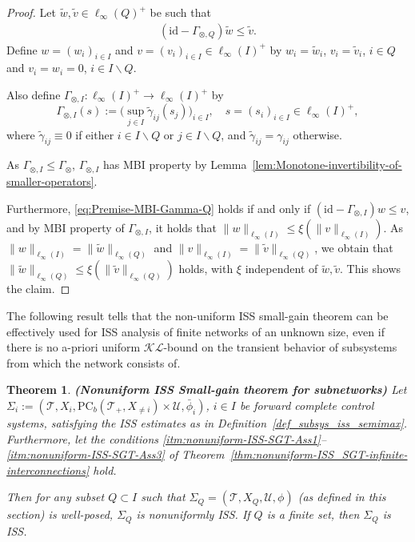 \documentclass[twocolumn]{IEEEtran} %
\newtheorem{theorem}{Theorem}[section]
\theoremstyle{definition}
\newcommand{\tm}{\times}%
\newcommand{\Uc}{\mathcal{U}}%
\newcommand{\KL}{\mathcal{KL}}%
\newcommand{\PC}{\mathrm{PC}}%
\newcommand{\id}{\mathrm{id}}%
\newcommand{\T}{\ensuremath{\mathcal{T}}}  %
\begin{document}
\begin{proof}
Let $\tilde{w},\tilde{v}\in \ell_{\infty}(Q)^+$ be such that 
\begin{eqnarray}
(\id - \Gamma_{\otimes,Q})\tilde{w} \leq \tilde{v}.
\label{eq:Premise-MBI-Gamma-Q}
\end{eqnarray}
Define $w = (w_i)_{i\in I}$ and $v = (v_i)_{i\in I} \in \ell_{\infty}(I)^+ $ by 
$w_i = \tilde{w}_i$, $v_i = \tilde{v}_i$, $i\in Q$ and $v_i = w_i = 0$, $i\in I\backslash Q$.

Also define $\Gamma_{\otimes,I}:  \ell_{\infty}(I)^+  \to  \ell_{\infty}(I)^+$ by 
\begin{equation}
\label{eq:Gain-operator-semimax-extending-restriction}
  \Gamma_{\otimes,I}(s) := \bigl(\sup_{j\in I}\tilde{\gamma}_{ij}(s_j)\bigr)_{i\in I},\quad s = (s_i)_{i\in I} \in \ell_{\infty}(I)^+,%
\end{equation}
where $\tilde{\gamma}_{ij}\equiv 0$ if either $i\in I\backslash Q$ or $j\in I\backslash Q$, and $\tilde{\gamma}_{ij} = \gamma_{ij}$ otherwise.

As $\Gamma_{\otimes,I}\leq \Gamma_{\otimes}$, $\Gamma_{\otimes,I}$ has MBI property by Lemma~\ref{lem:Monotone-invertibility-of-smaller-operators}. 

Furthermore, \eqref{eq:Premise-MBI-Gamma-Q} holds if and only if $(\id - \Gamma_{\otimes,I})w \leq v$, and by MBI property of $\Gamma_{\otimes,I}$, it holds that 
$\|w\|_{\ell_\infty(I)} \leq \xi(\|v\|_{\ell_\infty(I)})$. As $\|w\|_{\ell_\infty(I)} = \|\tilde{w}\|_{\ell_\infty(Q)}$ and $\|v\|_{\ell_\infty(I)} = \|\tilde{v}\|_{\ell_\infty(Q)}$,
we obtain that $\|\tilde{w}\|_{\ell_\infty(Q)} \leq \xi(\|\tilde{v}\|_{\ell_\infty(Q)})$ holds, with $\xi$ independent of $\tilde{w}, \tilde{v}$. This shows the claim.
\end{proof}

The following result tells that the non-uniform ISS small-gain theorem can be effectively used for ISS analysis of finite networks of an unknown size, even if there is no a-priori uniform $\KL$-bound on the transient behavior of subsystems from which the network consists of.


\begin{theorem} \textbf{(Nonuniform ISS Small-gain theorem for subnetworks)}
\label{thm:Subnetworks-stability-NU-SGT-based} 
Let $\Sigma_i:=(\T,X_i,\PC_b(\T_+,X_{\neq i}) \tm \Uc,\bar{\phi}_i)$, $i\in I$ be forward complete control systems, satisfying the ISS estimates as in Definition~\ref{def_subsys_iss_semimax}. 
Furthermore, let the conditions \ref{itm:nonuniform-ISS-SGT-Ass1}--\ref{itm:nonuniform-ISS-SGT-Ass3} of Theorem~\ref{thm:nonuniform-ISS_SGT-infinite-interconnections} hold.

Then for any subset $Q \subset I$ such that  $\Sigma_Q=(\T,X_Q,\Uc,\phi)$ (as defined in this section) is well-posed, $\Sigma_Q$ is nonuniformly ISS.
If $Q$ is a finite set, then $\Sigma_Q$ is ISS.
\end{theorem}
\end{document}
